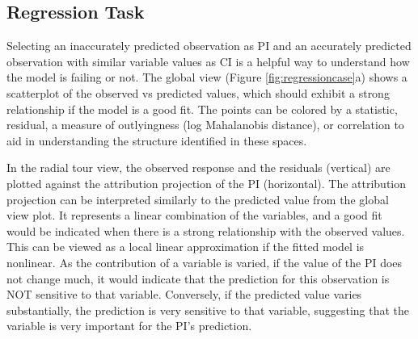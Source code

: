 \documentclass[
]{jss}
\begin{document}
\hypertarget{regression-task}{%
\subsection{Regression Task}\label{regression-task}}

Selecting an inaccurately predicted observation as PI and an accurately predicted observation with similar variable values as CI is a helpful way to understand how the model is failing or not. The global view (Figure \ref{fig:regressioncase}a) shows a scatterplot of the observed vs predicted values, which should exhibit a strong relationship if the model is a good fit. The points can be colored by a statistic, residual, a measure of outlyingness (log Mahalanobis distance), or correlation to aid in understanding the structure identified in these spaces.

In the radial tour view, the observed response and the residuals (vertical) are plotted against the attribution projection of the PI (horizontal). The attribution projection can be interpreted similarly to the predicted value from the global view plot. It represents a linear combination of the variables, and a good fit would be indicated when there is a strong relationship with the observed values. This can be viewed as a local linear approximation if the fitted model is nonlinear. As the contribution of a variable is varied, if the value of the PI does not change much, it would indicate that the prediction for this observation is NOT sensitive to that variable. Conversely, if the predicted value varies substantially, the prediction is very sensitive to that variable, suggesting that the variable is very important for the PI's prediction.
\end{document}

